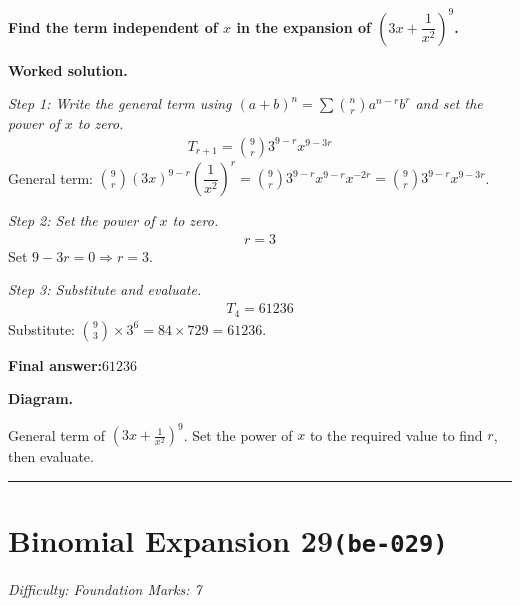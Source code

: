 \documentclass[11pt]{article}
\newcommand{\question}[1]{\par\medskip\noindent\textbf{#1}\par}
\begin{document}
\question{Find the term independent of \( x \) in the expansion of \( \left(3x + \dfrac{1}{x^2}\right)^9 \).}

\textbf{Worked solution.}

\textit{Step 1: Write the general term using \((a+b)^n = \sum \binom{n}{r} a^{n-r} b^r\) and set the power of \(x\) to zero.}
\[\begin{gathered}
T_{r+1} = \binom{9}{r} 3^{9-r} x^{9-3r}
\end{gathered}\]
General term: \( \binom{9}{r}(3x)^{9-r}\left(\dfrac{1}{x^2}\right)^r = \binom{9}{r} 3^{9-r} x^{9-r} x^{-2r} = \binom{9}{r} 3^{9-r} x^{9-3r} \).

\textit{Step 2: Set the power of \(x\) to zero.}
\[\begin{gathered}
r = 3
\end{gathered}\]
Set \(9 - 3r = 0 \Rightarrow r = 3\).

\textit{Step 3: Substitute and evaluate.}
\[\begin{gathered}
T_4 = 61236
\end{gathered}\]
Substitute: \(\binom{9}{3} \times 3^6 = 84 \times 729 = 61236\).

\begin{answerbox}
\textbf{Final answer:}\quad \(\displaystyle 61236\)
\end{answerbox}
\textbf{Diagram.}

\begin{center}
\end{center}
\small General term of $\left(3x+\frac{1}{x^{2}}\right)^{9}$. Set the power of $x$ to the required value to find $r$, then evaluate.\normalsize

\medskip\hrule

\section*{Binomial Expansion 29\quad\small\texttt{(be-029)}}
\textit{Difficulty: Foundation \quad\textbar\quad Marks: 7}
\end{document}
